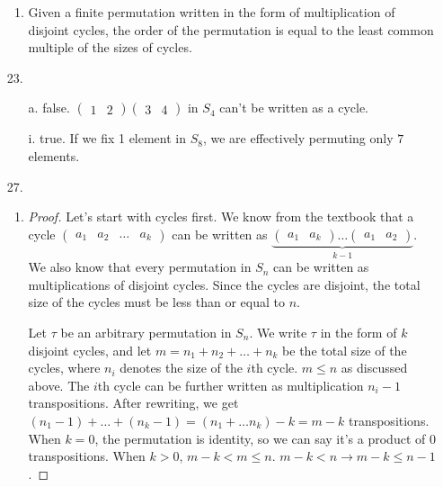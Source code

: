 \documentclass{article}
\begin{document}
\begin{itemize}
\begin{enumerate}[label=\alph*.]
  \item Given a finite permutation written in the form of multiplication of
    disjoint cycles, the order of the permutation is equal to the
    least common multiple of the sizes of cycles. 
  \end{enumerate}
\item [23.]
  \begin{itemize}
  \item [a.] false. $
    \begin{pmatrix}
      1 & 2
    \end{pmatrix}
    \begin{pmatrix}
      3 & 4
    \end{pmatrix}
    $ in $S_4$ can't be written as a cycle.
  \item [i.] true. If we fix 1 element in $S_8$, we are effectively
    permuting only $7$ elements.
  \end{itemize}
\item [27.]
  \begin{enumerate}[label=\alph*.]
  \item
    \begin{proof}
      Let's start with cycles first.  We know from the textbook that a
      cycle $
      \begin{pmatrix}
        a_1 & a_2 &\ldots &a_k
      \end{pmatrix}
      $ can be written as
      $ \underbrace{ \begin{pmatrix} a_1 & a_k \end{pmatrix}
        \ldots \begin{pmatrix} a_1 & a_2 \end{pmatrix}}_{k-1}$.  We
      also know that every permutation in $S_n$ can be written as
      multiplications of disjoint cycles. Since the cycles are
      disjoint, the total size of the cycles must be less than or
      equal to $n$.

      Let $\tau$ be an arbitrary permutation in $S_n$. We write $\tau$
      in the form of $k$ disjoint cycles, and let
      $m=n_1 + n_2 + \ldots + n_k$ be the total size of the cycles,
      where $n_i$ denotes the size of the $i$th cycle. $m \leq n$ as
      discussed above. The $i$th cycle can be further written as
      multiplication $n_i - 1$ transpositions. After rewriting, we get
      $(n_1 -1) + \ldots + (n_k -1) = (n_1 + \ldots n_k) - k = m - k$
      transpositions. When $k=0$, the permutation is identity, so we
      can say it's a product of $0$ transpositions. When $k > 0$,
      $m - k < m \leq n$. $m - k < n \rightarrow m - k \leq n -1$.


\end{proof}
\end{enumerate}
\end{itemize}
\end{document}

